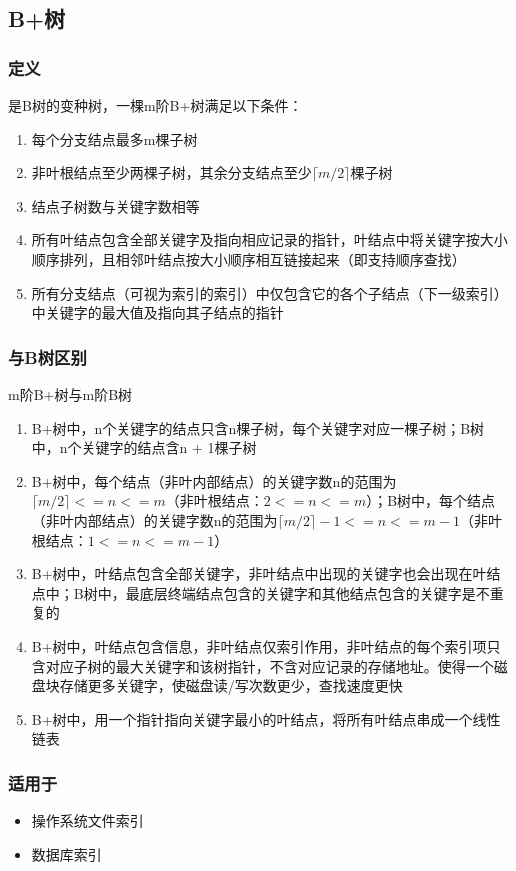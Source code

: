 \subsection{B+树}

\subsubsection{定义}
是B树的变种树，一棵m阶B+树满足以下条件：
\begin{enumerate}
    \item 每个分支结点最多m棵子树
    \item 非叶根结点至少两棵子树，其余分支结点至少\(\lceil m / 2\rceil\)棵子树
    \item 结点子树数与关键字数相等
    \item 所有叶结点包含全部关键字及指向相应记录的指针，叶结点中将关键字按大小顺序排列，且相邻叶结点按大小顺序相互链接起来（即支持顺序查找）
    \item 所有分支结点（可视为索引的索引）中仅包含它的各个子结点（下一级索引）中关键字的最大值及指向其子结点的指针
\end{enumerate}


\subsubsection{与B树区别}
m阶B+树与m阶B树
\begin{enumerate}
    \item B+树中，n个关键字的结点只含n棵子树，每个关键字对应一棵子树；B树中，n个关键字的结点含n + 1棵子树
    \item B+树中，每个结点（非叶内部结点）的关键字数n的范围为\(\lceil m / 2\rceil <= n <= m\)（非叶根结点：\(2 <= n <= m\)）；B树中，每个结点（非叶内部结点）的关键字数n的范围为\(\lceil m / 2\rceil - 1 <= n <= m - 1\)（非叶根结点：\(1 <= n <= m - 1\)）
    \item B+树中，叶结点包含全部关键字，非叶结点中出现的关键字也会出现在叶结点中；B树中，最底层终端结点包含的关键字和其他结点包含的关键字是不重复的
    \item B+树中，叶结点包含信息，非叶结点仅索引作用，非叶结点的每个索引项只含对应子树的最大关键字和该树指针，不含对应记录的存储地址。使得一个磁盘块存储更多关键字，使磁盘读/写次数更少，查找速度更快
    \item B+树中，用一个指针指向关键字最小的叶结点，将所有叶结点串成一个线性链表
\end{enumerate}


\subsubsection{适用于}
\begin{itemize}
    \item 操作系统文件索引
    \item 数据库索引
\end{itemize}


